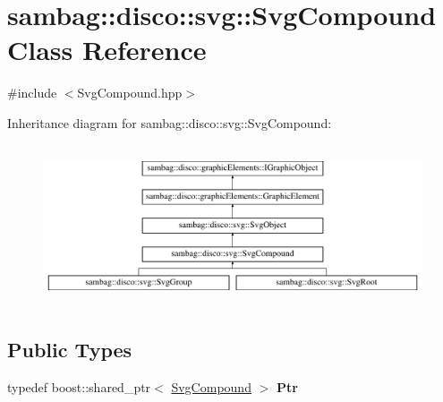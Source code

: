 \hypertarget{classsambag_1_1disco_1_1svg_1_1_svg_compound}{
\section{sambag::disco::svg::SvgCompound Class Reference}
\label{classsambag_1_1disco_1_1svg_1_1_svg_compound}
}


{\ttfamily \#include $<$SvgCompound.hpp$>$}

Inheritance diagram for sambag::disco::svg::SvgCompound:\begin{figure}[H]
\begin{center}
\leavevmode
\includegraphics[height=4.778157cm]{classsambag_1_1disco_1_1svg_1_1_svg_compound}
\end{center}
\end{figure}
\subsection*{Public Types}
\begin{DoxyCompactItemize}
\item 
\hypertarget{classsambag_1_1disco_1_1svg_1_1_svg_compound_a947fb6d7a19ded36f83bde3cad36a8e7}{
typedef boost::shared\_\-ptr$<$ \hyperlink{classsambag_1_1disco_1_1svg_1_1_svg_compound}{SvgCompound} $>$ {\bfseries Ptr}}
\label{classsambag_1_1disco_1_1svg_1_1_svg_compound_a947fb6d7a19ded36f83bde3cad36a8e7}

\end{DoxyCompactItemize}
